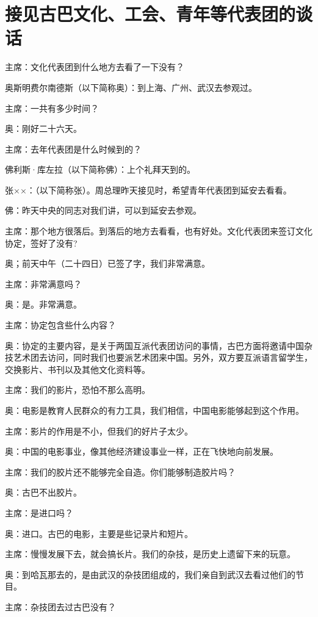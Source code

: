 \section[六月三日接见古巴文化、工会、青年等代表团的谈话（一九六三年七月二十六日）]{接见古巴文化、工会、青年等代表团的谈话}


主席：文化代表团到什么地方去看了一下没有？

奥斯明费尔南德斯（以下简称奥）：到上海、广州、武汉去参观过。

主席：一共有多少时间？

奥：刚好二十六天。

主席：去年代表团是什么时候到的？

佛利斯·库左拉（以下简称佛）：上个礼拜天到的。

张××：（以下简称张）。周总理昨天接见时，希望青年代表团到延安去看看。

佛：昨天中央的同志对我们讲，可以到延安去参观。

主席：那个地方很落后。到落后的地方去看看，也有好处。文化代表团来签订文化协定，签好了没有?

奥；前天中午（二十四日）已签了字，我们非常满意。

主席：非常满意吗？

奥：是。非常满意。

主席：协定包含些什么内容？

奥：协定的主要内容，是关于两国互派代表团访问的事情，古巴方面将邀请中国杂技艺术团去访问，同时我们也要派艺术团来中国。另外，双方要互派语言留学生，交换影片、书刊以及其他文化资料等。

主席：我们的影片，恐怕不那么高明。

奥：电影是教育人民群众的有力工具，我们相信，中国电影能够起到这个作用。

主席：影片的作用是不小，但我们的好片子太少。

奥：中国的电影事业，像其他经济建设事业一样，正在飞快地向前发展。

主席：我们的胶片还不能够完全自造。你们能够制造胶片吗？

奥：古巴不出胶片。

主席：是进口吗？

奥：进口。古巴的电影，主要是些记录片和短片。

主席：慢慢发展下去，就会搞长片。我们的杂技，是历史上遗留下来的玩意。

奥：到哈瓦那去的，是由武汉的杂技团组成的，我们亲自到武汉去看过他们的节目。

主席：杂技团去过古巴没有？

